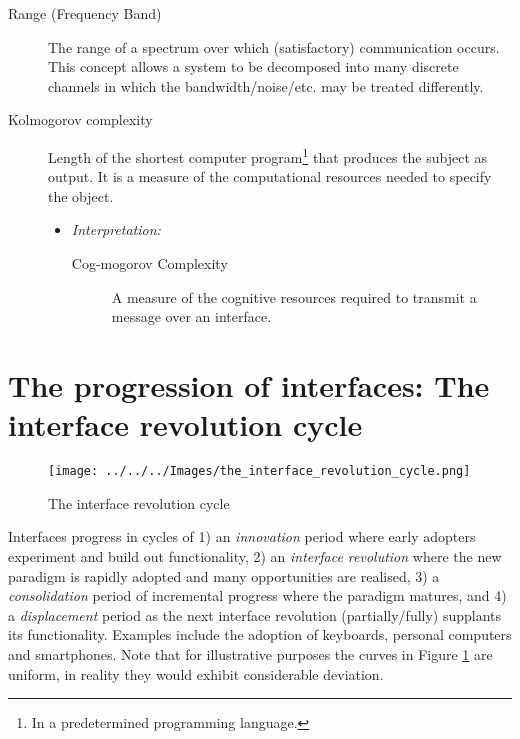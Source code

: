 \documentclass[logo,bsc,singlespacing,parskip]{infthesis}
\begin{document}
{\begin{mdframed}
\begin{description}
\item[{Range\label{range} (\label{org9e30e41}Frequency Band)}] The range of a spectrum over which (satisfactory) communication occurs. This concept allows a system to be decomposed into many discrete channels in which the bandwidth/noise/etc. may be treated differently.
\end{description}
\end{mdframed}

\begin{mdframed}
\begin{description}
\item[{Kolmogorov complexity}] Length of the shortest computer program\footnote{In a predetermined programming language.} that produces the subject as output. It is a measure of the computational resources needed to specify the object.
\begin{itemize}
\item \emph{Interpretation:}
\begin{description}
\item[{Cog-mogorov Complexity}] A measure of the cognitive resources required to transmit a message over an interface.
\end{description}
\end{itemize}
\end{description}
\end{mdframed}
}

\section{The progression of interfaces: The interface revolution cycle}
\label{sec:org1b17310}
\begin{figure}[h]
\centering
\texttt{[image: ../../../Images/the\_interface\_revolution\_cycle.png]}
\caption{\label{fig:interface_rev_cycle}The interface revolution cycle}
\end{figure}

Interfaces progress in cycles of 1) an \emph{innovation} period where early adopters experiment and build out functionality, 2) an \emph{interface revolution} where the new paradigm is rapidly adopted and many opportunities are realised, 3) a \emph{consolidation} period of incremental progress where the paradigm matures, and 4) a \emph{displacement} period as the next interface revolution (partially/fully) supplants its functionality.
Examples include the adoption of keyboards, personal computers and smartphones.
Note that for illustrative purposes the curves in Figure \ref{fig:interface_rev_cycle} are uniform, in reality they would exhibit considerable deviation.
\end{document}
